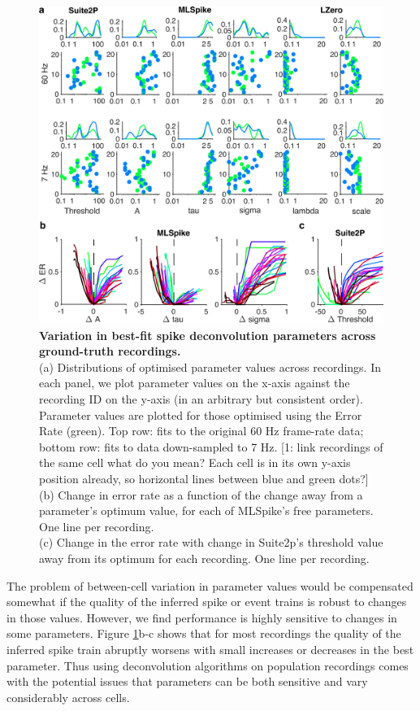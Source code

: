 \documentclass[a4paper,11pt]{article}
\begin{document}
\begin{figure}[h!]
\includegraphics[width=\textwidth]{composite_figs/fig2_param_sweep.png}
\caption{\textbf{Variation in best-fit spike deconvolution parameters across ground-truth recordings.} 	\label{fig:GT_data_params} \\
	(a) Distributions of optimised parameter values across recordings. In each panel, we plot parameter values on the x-axis against the recording ID on the y-axis (in an arbitrary but consistent order). Parameter values are plotted for those optimised using the Error Rate (green). Top row: fits to the original 60 Hz frame-rate data; bottom row: fits to data down-sampled to 7 Hz.  [1: link recordings of the same cell {\color{red} what do you mean? Each cell is in its own y-axis position already, so horizontal lines between blue and green dots?}] \\
	(b) Change in error rate as a function of the change away from a parameter's optimum value, for each of MLSpike's free parameters. One line per recording. \\
	(c) Change in the error rate with change in Suite2p's threshold value away from its optimum for each recording. One line per recording.
}
\end{figure}

The problem of between-cell variation in parameter values would be compensated somewhat if the quality of the inferred spike or event trains is robust to changes in those values. However, we find performance is highly sensitive to changes in some parameters. Figure \ref{fig:GT_data_params}b-c shows that for most recordings the quality of the inferred spike train abruptly worsens with small increases or decreases in the best parameter. Thus using deconvolution algorithms on population recordings comes with the potential issues that parameters can be both sensitive and vary considerably across cells.
\end{document}
